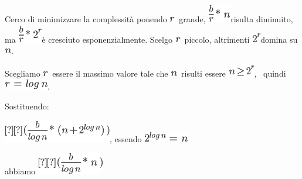 \documentclass{article}
\begin{document}
{Cerco di minimizzare la complessità ponendo
}\includegraphics{images/image83.png}{~grande,
}\includegraphics{images/image207.png}{risulta diminuito, ma
}\includegraphics{images/image208.png}{è cresciuto esponenzialmente.
Scelgo }\includegraphics{images/image83.png}{~piccolo, altrimenti
}\includegraphics{images/image209.png}{domina su
}\includegraphics{images/image41.png}{.}

{Scegliamo }\includegraphics{images/image83.png}{~essere il massimo
valore tale che }\includegraphics{images/image41.png}{~risulti essere
}\includegraphics{images/image210.png}{, ~quindi
}\includegraphics{images/image211.png}{.}

{Sostituendo:}

\includegraphics{images/image212.png}{, essendo
}\includegraphics{images/image213.png}{~}

{abbiamo }\includegraphics{images/image214.png}
\end{document}
